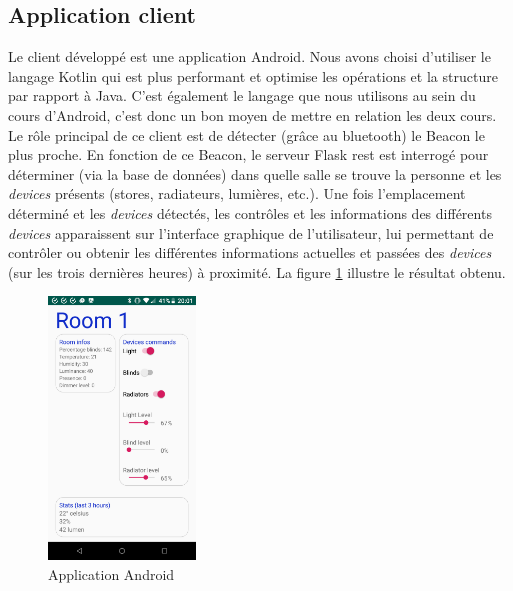 \subsection{Application client}
Le client développé est une application Android. Nous avons choisi d'utiliser le langage Kotlin qui est plus performant et optimise les opérations et la structure par rapport à Java. C'est également le langage que nous utilisons au sein du cours d'Android, c'est donc un bon moyen de mettre en relation les deux cours.
Le rôle principal de ce client est de détecter (grâce au bluetooth) le Beacon le plus proche. En fonction de ce Beacon, le serveur Flask \acrshort{rest} est interrogé pour déterminer (via la base de données) dans quelle salle se trouve la personne et les \textit{\textit{devices}} présents (stores, radiateurs, lumières, etc.). Une fois l'emplacement déterminé et les \textit{\textit{devices}} détectés, les contrôles et les informations des différents \textit{\textit{devices}} apparaissent sur l'interface graphique de l'utilisateur, lui permettant de contrôler ou obtenir les différentes informations actuelles et passées des \textit{\textit{devices}} (sur les trois dernières heures) à proximité. La figure \ref{app_android} illustre le résultat obtenu.
\begin{figure}
    \begin{center}
        \includegraphics[width=0.35\textwidth]{img/app.png}
    \end{center}
    \caption{Application Android}
    \label{app_android}
\end{figure}

